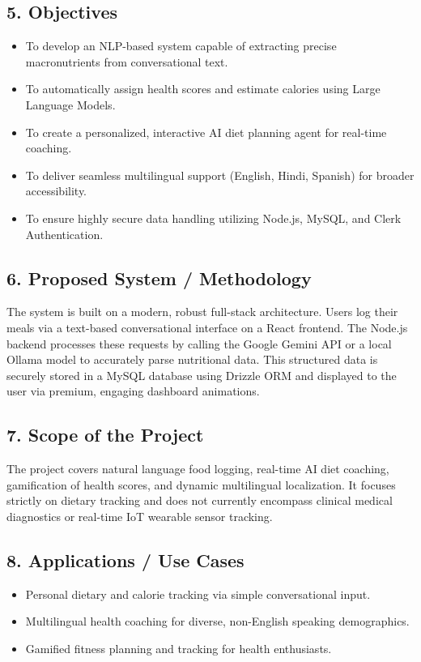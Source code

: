 \documentclass[12pt,a4paper]{report}
\begin{document}
\subsection*{5. Objectives}
\begin{itemize}[leftmargin=*]
    \item To develop an NLP-based system capable of extracting precise macronutrients from conversational text.
    \item To automatically assign health scores and estimate calories using Large Language Models.
    \item To create a personalized, interactive AI diet planning agent for real-time coaching.
    \item To deliver seamless multilingual support (English, Hindi, Spanish) for broader accessibility.
    \item To ensure highly secure data handling utilizing Node.js, MySQL, and Clerk Authentication.
\end{itemize}

\subsection*{6. Proposed System / Methodology}
The system is built on a modern, robust full-stack architecture. Users log their meals via a text-based conversational interface on a React frontend. The Node.js backend processes these requests by calling the Google Gemini API or a local Ollama model to accurately parse nutritional data. This structured data is securely stored in a MySQL database using Drizzle ORM and displayed to the user via premium, engaging dashboard animations.

\subsection*{7. Scope of the Project}
The project covers natural language food logging, real-time AI diet coaching, gamification of health scores, and dynamic multilingual localization. It focuses strictly on dietary tracking and does not currently encompass clinical medical diagnostics or real-time IoT wearable sensor tracking.

\subsection*{8. Applications / Use Cases}
\begin{itemize}[leftmargin=*]
    \item Personal dietary and calorie tracking via simple conversational input.
    \item Multilingual health coaching for diverse, non-English speaking demographics.
    \item Gamified fitness planning and tracking for health enthusiasts.
\end{itemize}
\end{document}
